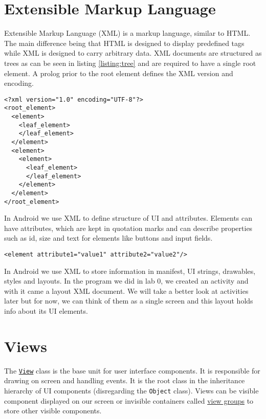 \graphicspath{{./lab01/Images/}}


\maketocpage

\section{Extensible Markup Language}
Extensible Markup Language (XML) is a markup language, similar to HTML. The main difference being that HTML is designed to display predefined tags while XML is designed to carry arbitrary data. XML documents are structured as trees as can be seen in listing \ref{listing:tree} and are required to have a single root element. A prolog prior to the root element defines the XML version and encoding.
\begin{lstlisting}[style=A_XML, caption={XML tree structure}, label = {listing:tree}]
<?xml version="1.0" encoding="UTF-8"?>
<root_element>
  <element>
    <leaf_element>
    </leaf_element>
  </element>
  <element>
    <element>
      <leaf_element>
      </leaf_element>
    </element>
  </element>
</root_element>
\end{lstlisting}
In Android we use XML to define structure of UI and attributes. Elements can have attributes, which are kept in quotation marks and can describe properties such as id, size and text for elements like buttons and input fields.
\begin{lstlisting}[style=A_XML]
<element attribute1="value1" attribute2="value2"/>
\end{lstlisting}
In Android we use XML to store information in manifest, UI strings, drawables, styles and layouts. In the program we did in lab 0, we created an activity and with it came a layout XML document. We will take a better look at activities later but for now, we can think of them as a single screen and this layout holds info about its UI elements.

\section{Views}
The \href{https://developer.android.com/reference/android/view/View.html}{\texttt{View}} class is the base unit for user interface components. It is responsible for drawing on screen and handling events. It is the root class in the inheritance hierarchy of UI components (disregarding the \texttt{Object} class). Views can be visible component displayed on our screen or invisible containers called \href{https://developer.android.com/reference/android/view/ViewGroup.html}{view groups} to store other visible components. 

